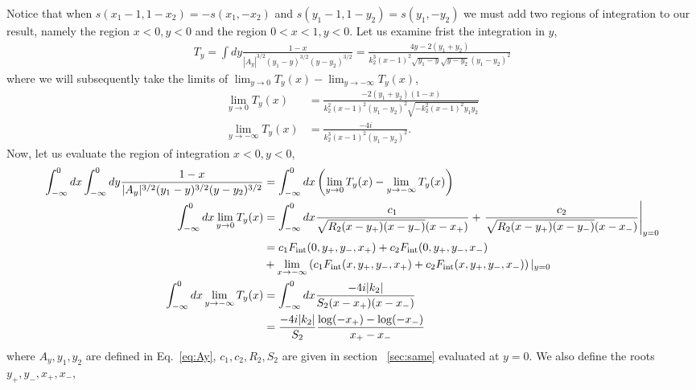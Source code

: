 \documentclass[twoside]{article}
\begin{document}
Notice that when $s(x_1 - 1, 1 - x_2) = -s(x_1, -x_2)$ and $s(y_1 - 1, 1 - y_2) = s(y_1, - y_2)$ we must add two regions of integration to
our result, namely the region $x < 0, y < 0$ and the region $0<x<1, y < 0$. Let us examine frist the integration in $y$,
\begin{align}
  T_y = \int dy\frac{1-x}{|A_y|^{3/2}(y_1 - y)^{3/2}(y - y_2)^{3/2}} = \frac{4y - 2(y_1 + y_2)}{k^3_2(x-1)^2\sqrt{y_1 - y}\sqrt{y - y_2}(y_1 -
  y_2)^2}
\end{align}
where we will subsequently take the limits of $\lim_{y \rightarrow 0}T_y(x) - \lim_{y \rightarrow -\infty}T_y(x)$,
\begin{align}
  \lim_{y \rightarrow 0}T_y(x) &=  \frac{-2(y_1 + y_2)(1 - x)}{k^2_2(x-1)^2(y_1 - y_2)^2\sqrt{-k^2_2(x-1)^2y_1y_2}}\\
  \lim_{y \rightarrow -\infty}T_y(x) &=  \frac{-4i}{k^3_2(x-1)^2(y_1 - y_2)^2}.
\end{align}
Now, let us evaluate the region of integration $x < 0, y < 0$,
\begin{align}
  \int^0_{-\infty}dx\int^0_{-\infty}dy\frac{1-x}{|A_y|^{3/2}(y_1 - y)^{3/2}(y - y_2)^{3/2}} &=  \int^0_{-\infty}dx\left( \lim_{y\rightarrow0}T_y(x) - \lim_{y \rightarrow -\infty}T_y(x) \right)\\
  \int^0_{-\infty}dx\lim_{y \rightarrow 0}T_y(x) &= \int^0_{-\infty}dx  \frac{c_1}{\sqrt{R_2(x - y_+)(x - y_-)}(x - x_+)} +
  \left.\frac{c_2}{\sqrt{R_2(x - y_+)(x - y_-)}(x - x_-)}\right\vert_{y = 0}\\
    &= c_1F_{\rm int}(0, y_+, y_-, x_+) + c_2F_{\rm int}(0, y_+, y_-, x_-) \nonumber \\
    &+\lim_{x \rightarrow -\infty}\left(c_1F_{\rm int}(x,y_+,y_-,x_+) + c_2F_{\rm int}(x, y_+,y_-,x_-)\right)\vert_{y = 0}\\
    \int^{0}_{-\infty}dx \lim_{y \rightarrow -\infty}T_y(x) &= \int^0_{-\infty}dx \frac{-4i|k_2|}{S_2(x-x_+)(x-x_-)}\\
    &= \frac{-4i|k_2|}{S_2}\frac{\log(-x_+) - \log(-x_-)}{x_+ - x_-}
\end{align}
where $A_y, y_1, y_2$ are defined in Eq.~\eqref{eq:Ay}, $c_1, c_2, R_2, S_2$ are given in section ~\ref{sec:same} evaluated at
$y = 0$. We also define the roots $y_+,y_-, x_+,x_-$,
\end{document}
